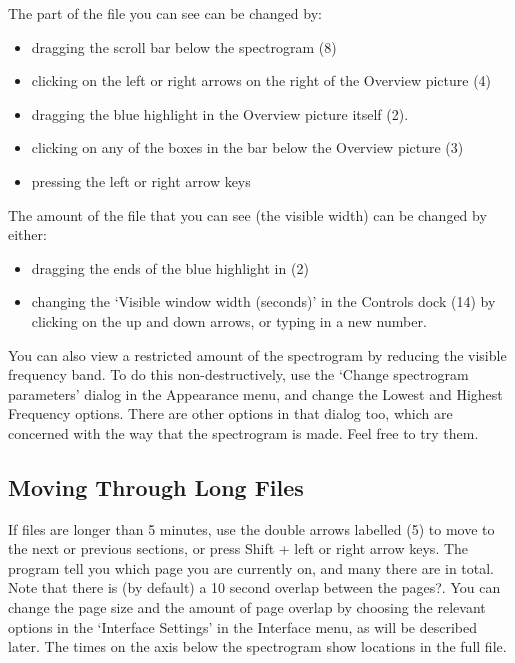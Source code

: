 \documentclass{article}
\begin{document}
The part of the file you can see can be changed by:
	\begin{itemize}
	\item dragging the scroll bar below the spectrogram (8)
	\item clicking on the left or right arrows on the right of the Overview picture (4)
	\item dragging the blue highlight in the Overview picture itself (2). 
	\item clicking on any of the boxes in the bar below the Overview picture (3)
	\item pressing the left or right arrow keys
	\end{itemize}
The amount of the file that you can see (the visible width) can be changed by either: 
	\begin{itemize}
	\item dragging the ends of the blue highlight in (2)
	\item changing the `Visible window width (seconds)' in the Controls dock (14) by clicking on the up and down arrows, or typing in a new number.
	\end{itemize}

You can also view a restricted amount of the spectrogram by reducing the visible frequency band. To do this non-destructively, use the `Change spectrogram parameters' dialog in the Appearance menu, and change the Lowest and Highest Frequency options. There are other options in that dialog too, which are concerned with the way that the spectrogram is made. Feel free to try them. %
\subsection{Moving Through Long Files}

If files are longer than 5 minutes, use the double arrows labelled (5) to move to the next or previous sections, or press Shift + left or right arrow keys. The program tell you which page you are currently on, and many there are in total. Note that there is (by default) a 10 second overlap between the pages?. You can change the page size and the amount of page overlap by choosing the relevant options in the `Interface Settings' in the Interface menu, as will be described later. The times on the axis below the spectrogram show locations in the full file.
\end{document}
